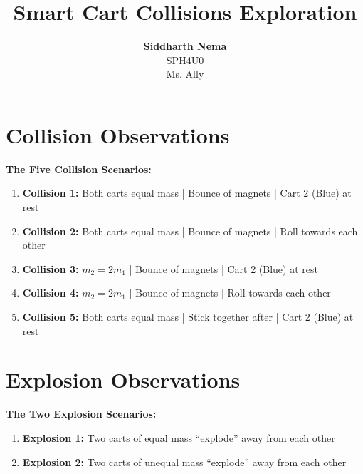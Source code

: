 \documentclass[12pt,letterpaper]{article}
\title{\textbf{Smart Cart Collisions Exploration}}
\author{\textbf{Siddharth Nema}\\SPH4U0 \\Ms.\hspace{-1mm} Ally}
\begin{document}
\maketitle
\newpage

\section{Collision Observations}
\textbf{The Five Collision Scenarios:}
\vspace{-4mm}
\begin{enumerate}
	\itemsep-0.75em
	\item \textbf{Collision 1:} Both carts equal mass | Bounce of magnets | Cart 2 (Blue) at rest
	\item \textbf{Collision 2:} Both carts equal mass | Bounce of magnets | Roll towards each other
	\item \textbf{Collision 3:} $m_{2} = 2m_{1}$ | Bounce of magnets | Cart 2 (Blue) at rest
	\item \textbf{Collision 4:} $m_{2} = 2m_{1}$ | Bounce of magnets | Roll towards each other
	\item \textbf{Collision 5:} Both carts equal mass | Stick together after | Cart 2 (Blue) at rest
\end{enumerate}



\newpage
\section{Explosion Observations}
\textbf{The Two Explosion Scenarios:}
\vspace{-4mm}
\begin{enumerate}
	\itemsep-0.75em
	\item \textbf{Explosion 1:} Two carts of equal mass “explode” away from each other
	\item \textbf{Explosion 2:} Two carts of unequal mass “explode” away from each other
\end{enumerate}


\end{document}
